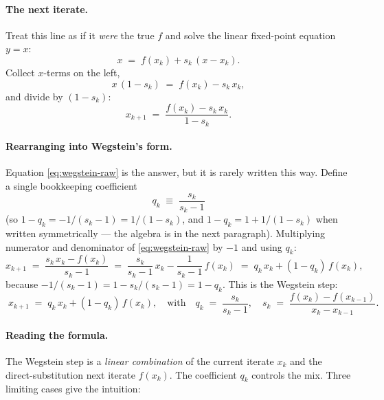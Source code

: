 \documentclass[11pt,a4paper]{article}
\begin{document}
\paragraph{The next iterate.}  Treat this line as if it \emph{were}
the true $f$ and solve the linear fixed-point equation $y = x$:
\[
   x \;=\; f(x_k) + s_k\,(x - x_k).
\]
Collect $x$-terms on the left,
\[
   x\,(1 - s_k) \;=\; f(x_k) - s_k\,x_k,
\]
and divide by $(1 - s_k)$:
\begin{equation}
   x_{k+1}
   \;=\; \frac{f(x_k) - s_k\,x_k}{1 - s_k}.
   \label{eq:wegstein-raw}
\end{equation}

\paragraph{Rearranging into Wegstein's form.}  Equation
\eqref{eq:wegstein-raw} is the answer, but it is rarely written this
way.  Define a single bookkeeping coefficient
\begin{equation}
   q_k \;\equiv\; \frac{s_k}{s_k - 1}
   \label{eq:wegstein-q}
\end{equation}
(so $1 - q_k = -1/(s_k - 1) = 1/(1 - s_k)$, and
$1 - q_k = 1 + 1/(1-s_k)$ when written symmetrically --- the algebra
is in the next paragraph).  Multiplying numerator and denominator of
\eqref{eq:wegstein-raw} by $-1$ and using $q_k$:
\[
   x_{k+1}
   \;=\; \frac{s_k\,x_k - f(x_k)}{s_k - 1}
   \;=\; \frac{s_k}{s_k-1}\,x_k - \frac{1}{s_k-1}\,f(x_k)
   \;=\; q_k\,x_k + (1 - q_k)\,f(x_k),
\]
because $-1/(s_k-1) = 1 - s_k/(s_k-1) = 1 - q_k$.
This is the Wegstein step:
\begin{equation}
   \boxed{\;
   x_{k+1} \;=\; q_k \, x_k + (1 - q_k) \, f(x_k),
   \quad\text{with}\quad
   q_k \;=\; \frac{s_k}{s_k-1},
   \quad
   s_k \;=\; \frac{f(x_k) - f(x_{k-1})}{x_k - x_{k-1}}.
   \;}
   \label{eq:wegstein}
\end{equation}

\paragraph{Reading the formula.}
The Wegstein step is a \emph{linear combination} of the current
iterate $x_k$ and the direct-substitution next iterate $f(x_k)$.
The coefficient $q_k$ controls the mix.  Three limiting cases give
the intuition:
\end{document}
